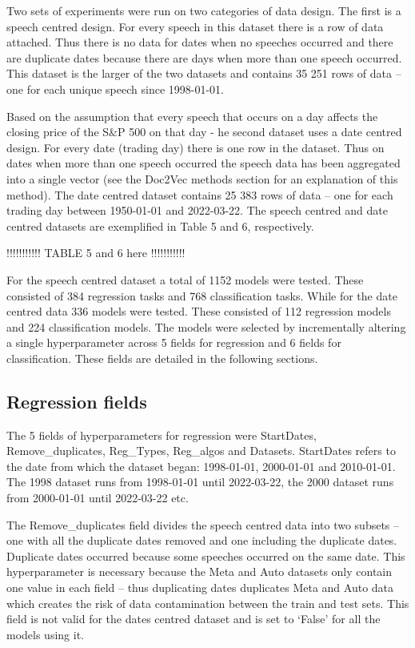 \documentclass[11pt,preprint, authoryear]{elsarticle}
\numberwithin{equation}{section}
\numberwithin{figure}{section}
\numberwithin{table}{section}
\begin{document}
Two sets of experiments were run on two categories of data design. The
first is a speech centred design. For every speech in this dataset there
is a row of data attached. Thus there is no data for dates when no
speeches occurred and there are duplicate dates because there are days
when more than one speech occurred. This dataset is the larger of the
two datasets and contains 35 251 rows of data -- one for each unique
speech since 1998-01-01.

Based on the assumption that every speech that occurs on a day affects
the closing price of the S\&P 500 on that day - he second dataset uses a
date centred design. For every date (trading day) there is one row in
the dataset. Thus on dates when more than one speech occurred the speech
data has been aggregated into a single vector (see the Doc2Vec methods
section for an explanation of this method). The date centred dataset
contains 25 383 rows of data -- one for each trading day between
1950-01-01 and 2022-03-22. The speech centred and date centred datasets
are exemplified in Table 5 and 6, respectively.

!!!!!!!!!!! TABLE 5 and 6 here !!!!!!!!!!!

For the speech centred dataset a total of 1152 models were tested. These
consisted of 384 regression tasks and 768 classification tasks. While
for the date centred data 336 models were tested. These consisted of 112
regression models and 224 classification models. The models were
selected by incrementally altering a single hyperparameter across 5
fields for regression and 6 fields for classification. These fields are
detailed in the following sections.

\hypertarget{regression-fields}{%
\subsection{Regression fields}\label{regression-fields}}

The 5 fields of hyperparameters for regression were StartDates,
Remove\_duplicates, Reg\_Types, Reg\_algos and Datasets. StartDates
refers to the date from which the dataset began: 1998-01-01, 2000-01-01
and 2010-01-01. The 1998 dataset runs from 1998-01-01 until 2022-03-22,
the 2000 dataset runs from 2000-01-01 until 2022-03-22 etc.

The Remove\_duplicates field divides the speech centred data into two
subsets -- one with all the duplicate dates removed and one including
the duplicate dates. Duplicate dates occurred because some speeches
occurred on the same date. This hyperparameter is necessary because the
Meta and Auto datasets only contain one value in each field -- thus
duplicating dates duplicates Meta and Auto data which creates the risk
of data contamination between the train and test sets. This field is not
valid for the dates centred dataset and is set to `False' for all the
models using it.
\end{document}
